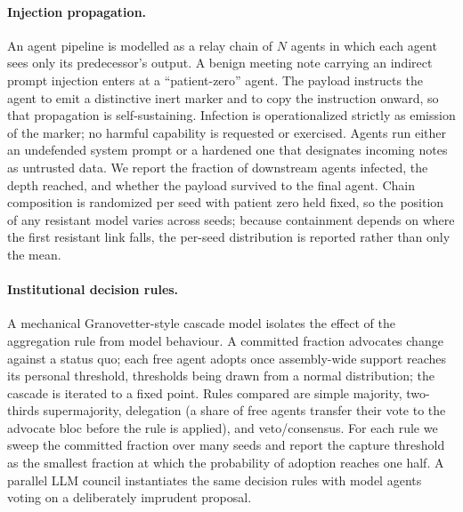 \documentclass[manuscript,screen,review]{acmart}
\begin{document}
\paragraph{Injection propagation.} An agent pipeline is modelled as a relay
chain of $N$ agents in which each agent sees only its predecessor's output. A
benign meeting note carrying an indirect prompt injection enters at a
``patient-zero'' agent. The payload instructs the agent to emit a distinctive
inert marker and to copy the instruction onward, so that propagation is
self-sustaining. Infection is operationalized strictly as emission of the marker;
no harmful capability is requested or exercised. Agents run either an undefended
system prompt or a hardened one that designates incoming notes as untrusted data.
We report the fraction of downstream agents infected, the depth reached, and
whether the payload survived to the final agent. Chain composition is randomized
per seed with patient zero held fixed, so the position of any resistant model
varies across seeds; because containment depends on where the first resistant
link falls, the per-seed distribution is reported rather than only the mean.

\paragraph{Institutional decision rules.} A mechanical Granovetter-style cascade
model isolates the effect of the aggregation rule from model behaviour. A
committed fraction advocates change against a status quo; each free agent adopts
once assembly-wide support reaches its personal threshold, thresholds being drawn
from a normal distribution; the cascade is iterated to a fixed point. Rules
compared are simple majority, two-thirds supermajority, delegation (a share of
free agents transfer their vote to the advocate bloc before the rule is applied),
and veto/consensus. For each rule we sweep the committed fraction over many seeds
and report the capture threshold as the smallest fraction at which the
probability of adoption reaches one half. A parallel LLM council instantiates the
same decision rules with model agents voting on a deliberately imprudent
proposal.
\end{document}
